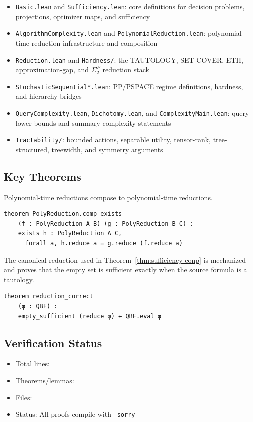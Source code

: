 \begin{itemize}
\item \texttt{Basic.lean} and \texttt{Sufficiency.lean}: core definitions for decision problems, projections, optimizer maps, and sufficiency
\item \texttt{AlgorithmComplexity.lean} and \texttt{PolynomialReduction.lean}: polynomial-time reduction infrastructure and composition
\item \texttt{Reduction.lean} and \texttt{Hardness/}: the TAUTOLOGY, SET-COVER, ETH, approximation-gap, and $\Sigma_2^P$ reduction stack
\item \texttt{StochasticSequential*.lean}: PP/PSPACE regime definitions, hardness, and hierarchy bridges
\item \texttt{QueryComplexity.lean}, \texttt{Dichotomy.lean}, and \texttt{ComplexityMain.lean}: query lower bounds and summary complexity statements
\item \texttt{Tractability/}: bounded actions, separable utility, tensor-rank, tree-structured, treewidth, and symmetry arguments
\end{itemize}

\subsection{Key Theorems}

\begin{theorem}\label{thm:poly-compose}
Polynomial-time reductions compose to polynomial-time reductions.
\end{theorem}

\begin{verbatim}
theorem PolyReduction.comp_exists
    (f : PolyReduction A B) (g : PolyReduction B C) :
    exists h : PolyReduction A C,
      forall a, h.reduce a = g.reduce (f.reduce a)
\end{verbatim}

\begin{theorem}
The canonical reduction used in Theorem~\ref{thm:sufficiency-conp} is mechanized and proves that the empty set is sufficient exactly when the source formula is a tautology.
\end{theorem}

\begin{verbatim}
theorem reduction_correct
    (φ : QBF) :
    empty_sufficient (reduce φ) ↔ QBF.eval φ
\end{verbatim}

\subsection{Verification Status}

\begin{itemize}
\item Total lines: \LeanTotalLines
\item Theorems/lemmas: \LeanTotalTheorems
\item Files: \LeanTotalFiles
\item Status: All proofs compile with \LeanTotalSorry\ \texttt{sorry}
\end{itemize}
